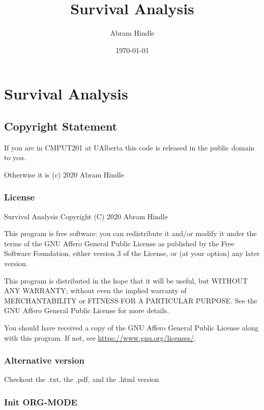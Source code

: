 \documentclass[11pt]{article}
\author{Abram Hindle}
\date{\today}
\title{Survival Analysis}
\begin{document}
\maketitle
\tableofcontents


\section{Survival Analysis}
\label{sec:orga24140f}
\subsection{Copyright Statement}
\label{sec:orgdc5389a}

If you are in CMPUT201 at UAlberta this code is released in the public
domain to you.

Otherwise it is (c) 2020 Abram Hindle

\subsubsection{License}
\label{sec:org931709a}

Survival Analysis
Copyright (C) 2020 Abram Hindle

This program is free software: you can redistribute it and/or modify
it under the terms of the GNU Affero General Public License as
published by the Free Software Foundation, either version 3 of the
License, or (at your option) any later version.

This program is distributed in the hope that it will be useful,
but WITHOUT ANY WARRANTY; without even the implied warranty of
MERCHANTABILITY or FITNESS FOR A PARTICULAR PURPOSE.  See the
GNU Affero General Public License for more details.

You should have received a copy of the GNU Affero General Public License
along with this program.  If not, see \url{https://www.gnu.org/licenses/}.

\subsubsection{Alternative version}
\label{sec:org845eaca}

Checkout the .txt, the .pdf, and the .html version

\subsubsection{Init ORG-MODE}
\label{sec:org7c47971}
\end{document}
